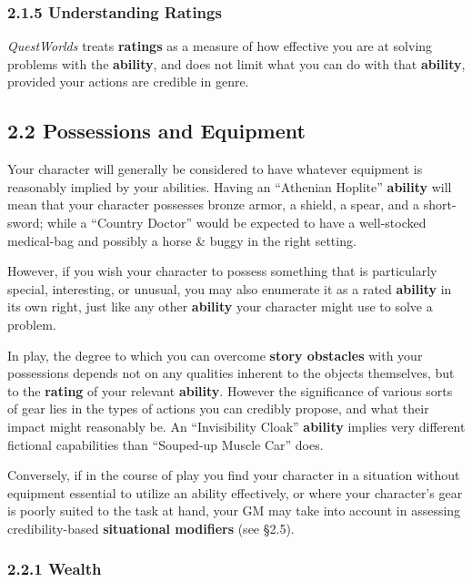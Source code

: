 \documentclass[
  11pt,
]{article}
\begin{document}
\hypertarget{understanding-ratings}{%
\subsubsection{2.1.5 Understanding
Ratings}\label{understanding-ratings}}

\emph{QuestWorlds} treats \textbf{ratings} as a measure of how effective
you are at solving problems with the \textbf{ability}, and does not
limit what you can do with that \textbf{ability}, provided your actions
are credible in genre.

\hypertarget{possessions-and-equipment}{%
\subsection{2.2 Possessions and
Equipment}\label{possessions-and-equipment}}

Your character will generally be considered to have whatever equipment
is reasonably implied by your abilities. Having an ``Athenian Hoplite''
\textbf{ability} will mean that your character possesses bronze armor, a
shield, a spear, and a short-sword; while a ``Country Doctor'' would be
expected to have a well-stocked medical-bag and possibly a horse \&
buggy in the right setting.

However, if you wish your character to possess something that is
particularly special, interesting, or unusual, you may also enumerate it
as a rated \textbf{ability} in its own right, just like any other
\textbf{ability} your character might use to solve a problem.

In play, the degree to which you can overcome \textbf{story obstacles}
with your possessions depends not on any qualities inherent to the
objects themselves, but to the \textbf{rating} of your relevant
\textbf{ability}. However the significance of various sorts of gear lies
in the types of actions you can credibly propose, and what their impact
might reasonably be. An ``Invisibility Cloak'' \textbf{ability} implies
very different fictional capabilities than ``Souped-up Muscle Car''
does.

Conversely, if in the course of play you find your character in a
situation without equipment essential to utilize an ability effectively,
or where your character's gear is poorly suited to the task at hand,
your GM may take into account in assessing credibility-based
\textbf{situational modifiers} (see §2.5).

\hypertarget{wealth}{%
\subsubsection{2.2.1 Wealth}\label{wealth}}
\end{document}
